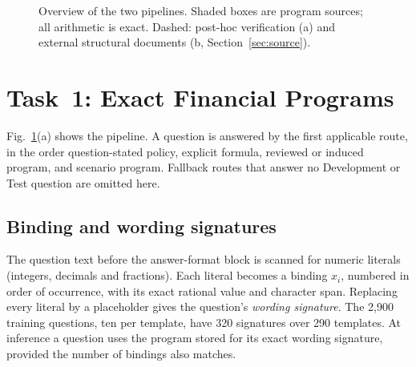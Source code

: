 \documentclass[conference]{IEEEtran}
\begin{document}
\begin{figure}[t]
\caption{Overview of the two pipelines. Shaded boxes are program sources; all arithmetic is exact. Dashed: post-hoc verification (a) and external structural documents (b, Section~\ref{sec:source}).}
\label{fig:pipelines}
\end{figure}

\section{Task~1: Exact Financial Programs}
Fig.~\ref{fig:pipelines}(a) shows the pipeline. A question is answered by the first applicable route, in the order question-stated policy, explicit formula, reviewed or induced program, and scenario program. Fallback routes that answer no Development or Test question are omitted here.

\subsection{Binding and wording signatures}
The question text before the answer-format block is scanned for numeric literals (integers, decimals and fractions). Each literal becomes a binding $x_i$, numbered in order of occurrence, with its exact rational value and character span. Replacing every literal by a placeholder gives the question's \emph{wording signature}. The 2,900 training questions, ten per template, have 320 signatures over 290 templates. At inference a question uses the program stored for its exact wording signature, provided the number of bindings also matches.
\end{document}
